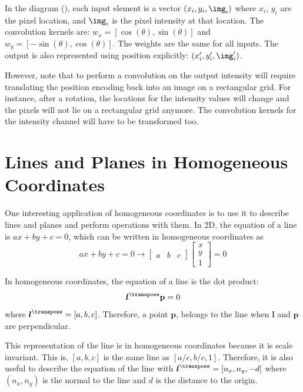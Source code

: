 In the diagram (\fig{\ref{fig:rotation_as_convolution}}), each input element is a vector
$(x_i,y_i,\img_i)$
where $x_i$, $y_i$ are the pixel location, and $\img_i$ is the pixel intensity at that location. 
The convolution kernels are: $w_x=[\cos ( \theta), \sin ( \theta)]$ and  $w_y=[-\sin ( \theta), \cos ( \theta)]$. The weights are the same for all inputs. The output is also represented using position explicitly: $(x'_i,y'_i,\img'_i)$.


However, note that to perform a convolution on the output intensity will require translating the position encoding back into an image on a rectangular grid. For instance, after a rotation, the locations for the intensity values will change and the pixels will not lie on a rectangular grid anymore. The convolution kernels for the intensity channel will have to be transformed too.

\section{Lines and Planes in Homogeneous Coordinates}

One interesting application of homogeneous coordinates is to use it to describe lines and planes and perform operations with them. In 2D, the equation of a line is $ax+by+c=0$, which can be written in homogeneous coordinates as
\begin{equation}
    ax+by+c=0 \rightarrow 
    \begin{bmatrix}
    a & b & c 
    \end{bmatrix}
    \begin{bmatrix}
    x \\
    y \\
    1
    \end{bmatrix}
    = 0
\end{equation}

In homogeneous coordinates, the equation of a line is the dot product:
\begin{equation}
    \boldsymbol{l} ^\transpose \mathbf{p} = 0
\end{equation}
where $\boldsymbol{l}^\transpose = \left [a, b, c\right ]$. Therefore, a point $\mathbf{p}$, belongs to the line when $\boldsymbol{l}$ and $\mathbf{p}$ are perpendicular. 


This representation of the line is in homogeneous coordinates because it is scale invariant. This is, $\left [a, b, c\right ]$ is the same line as $\left [a/c, b/c, 1\right ]$. Therefore, it is also useful to describe the equation of the line with $\boldsymbol{l}^\transpose = \left [n_x, n_y, -d\right ]$ where $(n_x,n_y)$ is the normal to the line and $d$ is the distance to the origin. 

